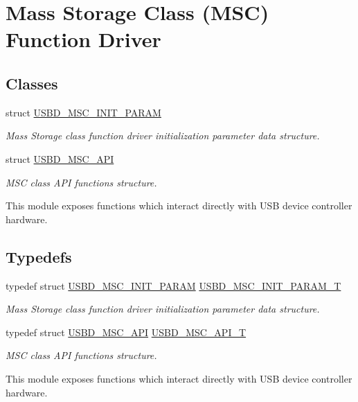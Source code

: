 \hypertarget{group___u_s_b_d___m_s_c}{}\section{Mass Storage Class (M\+SC) Function Driver}
\label{group___u_s_b_d___m_s_c}
\subsection*{Classes}
\begin{DoxyCompactItemize}
\item 
struct \hyperlink{struct_u_s_b_d___m_s_c___i_n_i_t___p_a_r_a_m}{U\+S\+B\+D\+\_\+\+M\+S\+C\+\_\+\+I\+N\+I\+T\+\_\+\+P\+A\+R\+AM}
\begin{DoxyCompactList}\small\item\em Mass Storage class function driver initialization parameter data structure. \end{DoxyCompactList}\item 
struct \hyperlink{struct_u_s_b_d___m_s_c___a_p_i}{U\+S\+B\+D\+\_\+\+M\+S\+C\+\_\+\+A\+PI}
\begin{DoxyCompactList}\small\item\em M\+SC class A\+PI functions structure.

This module exposes functions which interact directly with U\+SB device controller hardware. \end{DoxyCompactList}\end{DoxyCompactItemize}
\subsection*{Typedefs}
\begin{DoxyCompactItemize}
\item 
typedef struct \hyperlink{struct_u_s_b_d___m_s_c___i_n_i_t___p_a_r_a_m}{U\+S\+B\+D\+\_\+\+M\+S\+C\+\_\+\+I\+N\+I\+T\+\_\+\+P\+A\+R\+AM} \hyperlink{group___u_s_b_d___m_s_c_ga01cbe726c0ee97ee44661ca88d7e8fbd}{U\+S\+B\+D\+\_\+\+M\+S\+C\+\_\+\+I\+N\+I\+T\+\_\+\+P\+A\+R\+A\+M\+\_\+T}
\begin{DoxyCompactList}\small\item\em Mass Storage class function driver initialization parameter data structure. \end{DoxyCompactList}\item 
typedef struct \hyperlink{struct_u_s_b_d___m_s_c___a_p_i}{U\+S\+B\+D\+\_\+\+M\+S\+C\+\_\+\+A\+PI} \hyperlink{group___u_s_b_d___m_s_c_ga521bb0e0edf4060aeb10827c6c29f7cf}{U\+S\+B\+D\+\_\+\+M\+S\+C\+\_\+\+A\+P\+I\+\_\+T}
\begin{DoxyCompactList}\small\item\em M\+SC class A\+PI functions structure.

This module exposes functions which interact directly with U\+SB device controller hardware. \end{DoxyCompactList}\end{DoxyCompactItemize}


